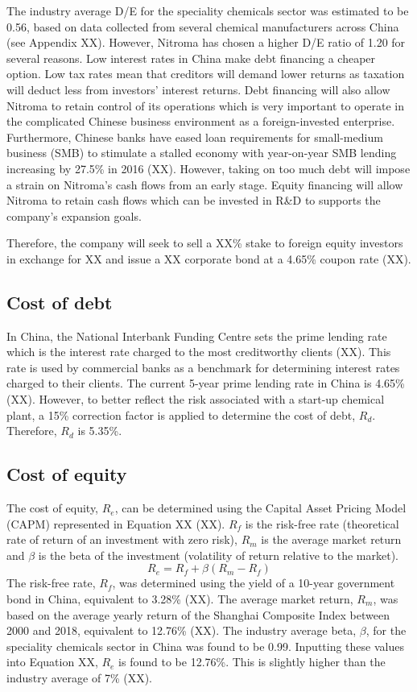 The industry average D/E for the speciality chemicals sector was estimated to be 0.56, based on data collected from several chemical manufacturers across China (see Appendix XX). However, Nitroma has chosen a higher D/E ratio of 1.20 for several reasons. Low interest rates in China make debt financing a cheaper option. Low tax rates mean that creditors will demand lower returns as taxation will deduct less from investors’ interest returns. Debt financing will also allow Nitroma to retain control of its operations which is very important to operate in the complicated Chinese business environment as a foreign-invested enterprise. Furthermore, Chinese banks have eased loan requirements for small-medium business (SMB) to stimulate a stalled economy with year-on-year SMB lending increasing by 27.5\% in 2016 (XX). However, taking on too much debt will impose a strain on Nitroma’s cash flows from an early stage. Equity financing will allow Nitroma to retain cash flows which can be invested in R\&D to supports the company’s expansion goals.

Therefore, the company will seek to sell a XX\% stake to foreign equity investors in exchange for XX and issue a XX corporate bond at a 4.65\% coupon rate (XX).

\subsection{Cost of debt}
In China, the National Interbank Funding Centre sets the prime lending rate which is the interest rate charged to the most creditworthy clients (XX). This rate is used by commercial banks as a benchmark for determining interest rates charged to their clients. The current 5-year prime lending rate in China is 4.65\% (XX). However, to better reflect the risk associated with a start-up chemical plant, a 15\% correction factor is applied to determine the cost of debt, $R_{d}$. Therefore, $R_{d}$ is 5.35\%.

\subsection{Cost of equity}
The cost of equity, $R_{e}$, can be determined using the Capital Asset Pricing Model (CAPM) represented in Equation XX (XX). $R_{f}$ is the risk-free rate (theoretical rate of return of an investment with zero risk), $R_{m}$ is the average market return and $\beta$ is the beta of the investment (volatility of return relative to the market).
\begin{equation}
\label{eqn:capm}
    R_{e}=R_{f}+\beta(R_{m}-R_{f})
\end{equation}
The risk-free rate, $R_{f}$, was determined using the yield of a 10-year government bond in China, equivalent to 3.28\% (XX). The average market return, $R_{m}$, was based on the average yearly return of the Shanghai Composite Index between 2000 and 2018, equivalent to 12.76\% (XX). The industry average beta, $\beta$, for the speciality chemicals sector in China was found to be 0.99. Inputting these values into Equation XX, $R_{e}$ is found to be 12.76\%. This is slightly higher than the industry average of 7\% (XX).

